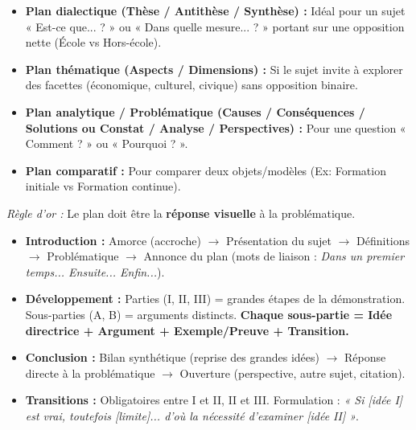 \documentclass[11pt]{article}
\begin{document}
\begin{methode}
\begin{itemize}
    \item \textbf{Plan dialectique (Thèse / Antithèse / Synthèse) :} Idéal pour un sujet « Est-ce que... ? » ou « Dans quelle mesure... ? » portant sur une opposition nette (École vs Hors-école).
    \item \textbf{Plan thématique (Aspects / Dimensions) :} Si le sujet invite à explorer des facettes (économique, culturel, civique) sans opposition binaire.
    \item \textbf{Plan analytique / Problématique (Causes / Conséquences / Solutions ou Constat / Analyse / Perspectives) :} Pour une question « Comment ? » ou « Pourquoi ? ».
    \item \textbf{Plan comparatif :} Pour comparer deux objets/modèles (Ex: Formation initiale vs Formation continue).
\end{itemize}
\emph{Règle d'or :} Le plan doit être la \textbf{réponse visuelle} à la problématique.
\end{methode}

\begin{propriete}
\begin{itemize}
    \item \textbf{Introduction :} Amorce (accroche) $\rightarrow$ Présentation du sujet $\rightarrow$ Définitions $\rightarrow$ Problématique $\rightarrow$ Annonce du plan (mots de liaison : \emph{Dans un premier temps... Ensuite... Enfin...}).
    \item \textbf{Développement :} Parties (I, II, III) = grandes étapes de la démonstration. Sous-parties (A, B) = arguments distincts. \textbf{Chaque sous-partie = Idée directrice + Argument + Exemple/Preuve + Transition.}
    \item \textbf{Conclusion :} Bilan synthétique (reprise des grandes idées) $\rightarrow$ Réponse directe à la problématique $\rightarrow$ Ouverture (perspective, autre sujet, citation).
    \item \textbf{Transitions :} Obligatoires entre I et II, II et III. Formulation : \emph{« Si [idée I] est vrai, toutefois [limite]... d'où la nécessité d'examiner [idée II] »}.
\end{itemize}
\end{propriete}
\end{document}
